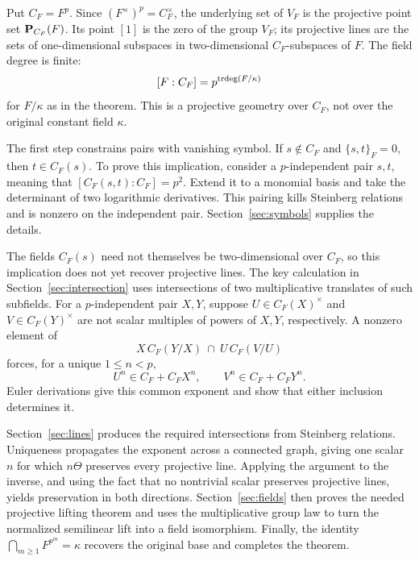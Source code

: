 Put $C_F=F^p$. Since $(F^\times)^p=C_F^\times$, the underlying
set of $V_F$ is the projective point set $\mathbf P_{C_F}(F)$.
Its point $[1]$ is the zero of the group $V_F$; its projective lines
are the sets of one-dimensional subspaces in two-dimensional
$C_F$-subspaces of $F$. The field degree is finite:
\[
                         [F:C_F]=p^{\operatorname{trdeg}(F/\kappa)}
\]
for $F/\kappa$ as in the theorem. This is a projective geometry over
$C_F$, not over the original constant field $\kappa$.

The first step constrains pairs with vanishing symbol.
If $s\notin C_F$ and $\{s,t\}_F=0$, then $t\in C_F(s)$.
To prove this implication, consider a $p$-independent pair $s,t$, meaning
that $[C_F(s,t):C_F]=p^2$. Extend it to a monomial basis and take the
determinant of two logarithmic derivatives. This
pairing kills Steinberg relations and is nonzero on the independent
pair. Section~\ref{sec:symbols} supplies the details.

The fields $C_F(s)$ need not themselves be two-dimensional over $C_F$,
so this implication does not yet recover projective lines. The key
calculation in Section~\ref{sec:intersection} uses intersections of
two multiplicative translates of such subfields. For a $p$-independent
pair $X,Y$, suppose $U\in C_F(X)^\times$ and
$V\in C_F(Y)^\times$ are not scalar multiples of powers of $X,Y$,
respectively. A nonzero element of
\[
             X\,C_F(Y/X)\ \cap\ U\,C_F(V/U)
\]
forces, for a unique $1\le n<p$,
\[
                    U^n\in C_F+C_FX^n,
                    \qquad V^n\in C_F+C_FY^n.
\]
Euler derivations give this common exponent and show that either
inclusion determines it.

Section~\ref{sec:lines} produces the required intersections from
Steinberg relations. Uniqueness propagates the exponent across a
connected graph, giving one scalar $n$ for which $n\Theta$ preserves
every projective line. Applying the argument to the inverse, and using
the fact that no nontrivial scalar preserves projective lines, yields
preservation in both directions. Section~\ref{sec:fields} then proves
the needed projective lifting theorem and uses the multiplicative group
law to turn the normalized semilinear lift into a field isomorphism.
Finally, the identity
$\bigcap_{m\ge1}F^{p^m}=\kappa$ recovers the original base and
completes the theorem.
